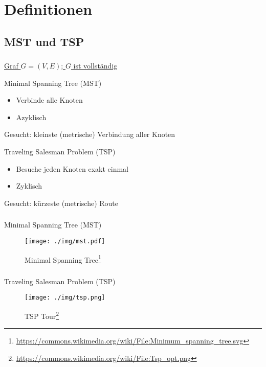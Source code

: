 \section{Definitionen}
\subsection{MST und TSP}

\begin{frame}
    \frametitle{\insertsubsection}
    \underline{Graf $G = (V, E)$; $G$ ist vollständig}
    \vspace{.7em}
    \begin{block}{Minimal Spanning Tree (MST)}
        \vspace{.7em}
        \begin{itemize}
            \itemsep\setlength{.8em}
            \item Verbinde alle Knoten
            \item Azyklisch
        \end{itemize}
        Gesucht: kleinste (metrische) Verbindung aller Knoten
    \end{block}
    \vspace{.7em}
    \begin{block}{Traveling Salesman Problem (TSP)}
        \vspace{.7em}
        \begin{itemize}
            \itemsep\setlength{.8em}
            \item Besuche jeden Knoten exakt einmal
            \item Zyklisch
        \end{itemize}
        Gesucht: kürzeste (metrische) Route
    \end{block}
\end{frame}

\begin{frame}
    \frametitle{\insertsubsection}
    Minimal Spanning Tree (MST)
    \begin{figure}
        \centering
        \texttt{[image: ./img/mst.pdf]}
        \caption{Minimal Spanning Tree\footnote{\url{https://commons.wikimedia.org/wiki/File:Minimum_spanning_tree.svg}}}
    \end{figure}
\end{frame}



\begin{frame}
    \frametitle{\insertsubsection}
    Traveling Salesman Problem (TSP)
    \begin{figure}
        \centering
        \texttt{[image: ./img/tsp.png]}
        \caption{TSP Tour\footnote{\url{https://commons.wikimedia.org/wiki/File:Tsp_opt.png}}}
    \end{figure}
\end{frame}
